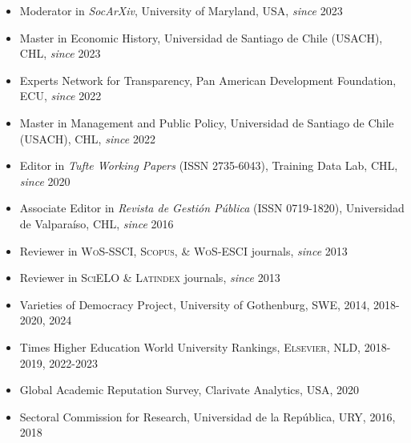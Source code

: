 





\begin{publications}

\begin{itemize}
\item{\small Moderator in {\itshape SocArXiv}, University of Maryland, USA, {\itshape since} 2023}
\item{\small Master in Economic History, Universidad de Santiago de Chile (USACH), CHL, {\itshape since} 2023}
\item{\small Experts Network for Transparency, Pan American Development Foundation, ECU, {\itshape since} 2022}
\item{\small Master in Management and Public Policy, Universidad de Santiago de Chile (USACH), CHL, {\itshape since} 2022}
\item{\small Editor in {\itshape Tufte Working Papers} (ISSN 2735-6043), Training Data Lab, CHL, {\itshape since} 2020}
\item{\small Associate Editor in {\itshape Revista de Gestión Pública} (ISSN 0719-1820), Universidad de Valparaíso, CHL, {\itshape since} 2016}
\item{\small Reviewer in {\scshape WoS-SSCI}, {\scshape Scopus}, \& {\scshape WoS-ESCI} journals, {\itshape since} 2013}
\item{\small Reviewer in {\scshape SciELO} \& {\scshape Latindex} journals, {\itshape since} 2013}
\item{\small Varieties of Democracy Project, University of Gothenburg, SWE, 2014, 2018-2020, 2024}
\item{\small Times Higher Education World University Rankings, {\scshape Elsevier}, NLD, 2018-2019, 2022-2023}
\item{\small Global Academic Reputation Survey, Clarivate Analytics, USA, 2020}
\item{\small Sectoral Commission for Research, Universidad de la República, URY, 2016, 2018}
\end{itemize}

\vspace{1mm}
\end{publications}
